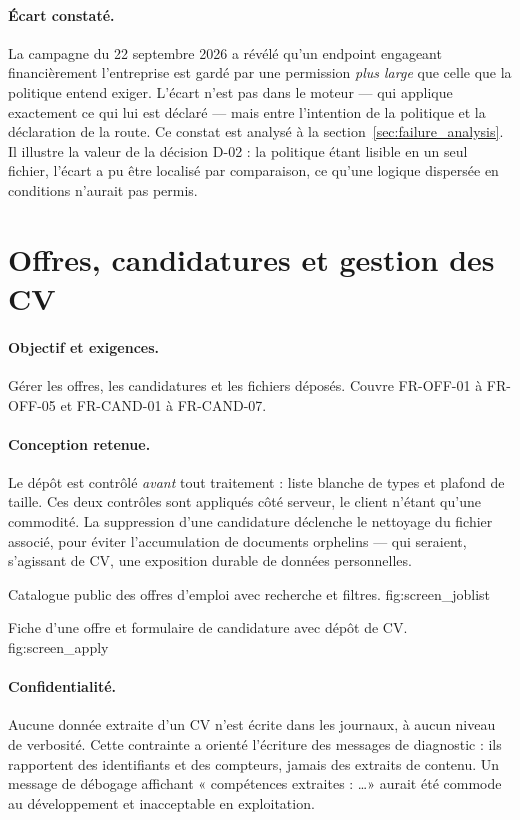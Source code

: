 \paragraph{Écart constaté.} La campagne du 22 septembre 2026 a révélé qu'un
endpoint engageant financièrement l'entreprise est gardé par une permission
\emph{plus large} que celle que la politique entend exiger. L'écart n'est pas
dans le moteur — qui applique exactement ce qui lui est déclaré — mais entre
l'intention de la politique et la déclaration de la route. Ce constat est
analysé à la section~\ref{sec:failure_analysis}. Il illustre la valeur de la
décision D-02 : la politique étant lisible en un seul fichier, l'écart a pu
être localisé par comparaison, ce qu'une logique dispersée en conditions
n'aurait pas permis.

\section{Offres, candidatures et gestion des CV}
\label{sec:impl_recruitment}

\paragraph{Objectif et exigences.} Gérer les offres, les candidatures et les
fichiers déposés. Couvre FR-OFF-01 à FR-OFF-05 et FR-CAND-01 à FR-CAND-07.

\paragraph{Conception retenue.} Le dépôt est contrôlé \emph{avant} tout
traitement : liste blanche de types et plafond de taille. Ces deux contrôles
sont appliqués côté serveur, le client n'étant qu'une commodité. La suppression
d'une candidature déclenche le nettoyage du fichier associé, pour éviter
l'accumulation de documents orphelins — qui seraient, s'agissant de CV, une
exposition durable de données personnelles.

  {Catalogue public des offres d'emploi avec recherche et filtres.}
  {fig:screen_joblist}

  {Fiche d'une offre et formulaire de candidature avec dépôt de CV.}
  {fig:screen_apply}

\paragraph{Confidentialité.} Aucune donnée extraite d'un CV n'est écrite dans
les journaux, à aucun niveau de verbosité. Cette contrainte a orienté
l'écriture des messages de diagnostic : ils rapportent des identifiants et des
compteurs, jamais des extraits de contenu. Un message de débogage affichant
« compétences extraites : \ldots » aurait été commode au développement et
inacceptable en exploitation.

